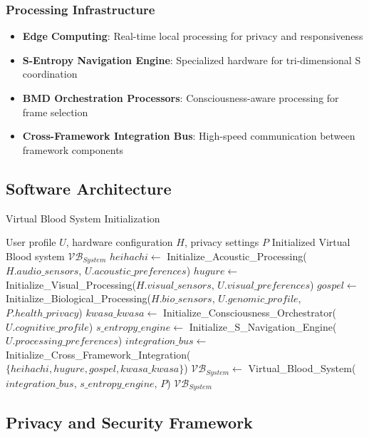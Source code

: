 \documentclass[12pt,a4paper]{article}
\begin{document}
\subsubsection{Processing Infrastructure}
\begin{itemize}
\item \textbf{Edge Computing}: Real-time local processing for privacy and responsiveness
\item \textbf{S-Entropy Navigation Engine}: Specialized hardware for tri-dimensional S coordination
\item \textbf{BMD Orchestration Processors}: Consciousness-aware processing for frame selection
\item \textbf{Cross-Framework Integration Bus}: High-speed communication between framework components
\end{itemize}

\subsection{Software Architecture}

\begin{algorithm}
\caption{Virtual Blood System Initialization}
\begin{algorithmic}[1]
\REQUIRE User profile $U$, hardware configuration $H$, privacy settings $P$
\ENSURE Initialized Virtual Blood system $\mathcal{VB}_{System}$
\STATE $heihachi \leftarrow$ Initialize\_Acoustic\_Processing($H.audio\_sensors$, $U.acoustic\_preferences$)
\STATE $hugure \leftarrow$ Initialize\_Visual\_Processing($H.visual\_sensors$, $U.visual\_preferences$)
\STATE $gospel \leftarrow$ Initialize\_Biological\_Processing($H.bio\_sensors$, $U.genomic\_profile$, $P.health\_privacy$)
\STATE $kwasa\_kwasa \leftarrow$ Initialize\_Consciousness\_Orchestrator($U.cognitive\_profile$)
\STATE $s\_entropy\_engine \leftarrow$ Initialize\_S\_Navigation\_Engine($U.processing\_preferences$)
\STATE $integration\_bus \leftarrow$ Initialize\_Cross\_Framework\_Integration($\{heihachi, hugure, gospel, kwasa\_kwasa\}$)
\STATE $\mathcal{VB}_{System} \leftarrow$ Virtual\_Blood\_System($integration\_bus$, $s\_entropy\_engine$, $P$)
\RETURN $\mathcal{VB}_{System}$
\end{algorithmic}
\end{algorithm}

\subsection{Privacy and Security Framework}
\end{document}
